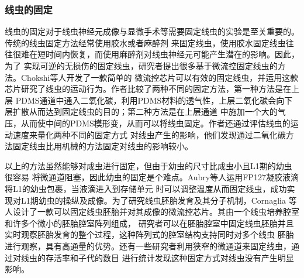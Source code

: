 \subsubsection{线虫的固定}
\label{sec:intro:analog}
	线虫的固定对于线虫神经元成像与显微手术\cite{Gokce2014A}等需要固定线虫的实验是至关重要的。传统的线虫固定方法经常使用胶水或者麻醉剂
	来固定线虫，使用胶水固定线虫往往很难在短时间内恢复，而使用麻醉剂对线虫神经元可能产生潜在的影响。因此，为了
	实现可逆的无损伤的固定线虫，研究者提出很多基于微流控固定线虫的方法。Chokshi等人\cite{Chokshi2009CO2}开发了一款简单的
	微流控芯片可以有效的固定线虫，并运用这款芯片研究了线虫的运动行为。作者比较了两种不同的固定方法，第一种方法是在上层
	PDMS通道中通入二氧化碳，利用PDMS材料的透气性，上层二氧化碳会向下层扩散从而达到固定线虫的目的；第二种方法是在上层通道
	中施加一个大的气压，从而使中间的PDMS模形变，从而可以将线虫固定。作者还通过评估线虫的运动速度来量化两种不同的固定方式
	对线虫产生的影响，他们发现通过二氧化碳方法固定线虫比用机械的方法固定对线虫的影响较小。
	
	以上的方法虽然能够对成虫进行固定，但由于幼虫的尺寸比成虫小且L1期的幼虫很容易
	将微通道阻塞，因此幼虫的固定是个难点。Aubry等人\cite{Aubry2015Hydrogel}运用FP127凝胶液滴将L1的幼虫包裹，当液滴进入到存储单元
	时可以调整温度从而固定线虫，成功实现对L1期幼虫的操纵及成像。为了研究线虫胚胎发育及其分子机制，Cornaglia
	等人\cite{Cornaglia2015An}设计了一款可以固定线虫胚胎并对其成像的微流控芯片。其由一个线虫培养腔室和许多个微小的胚胎腔室阵列组成，
	研究者可以在胚胎腔室中固定线虫胚胎并且实时观察胚胎发育的整个过程，这种阵列式的腔室结构支持同时对多个线虫
	胚胎进行观察，具有高通量的优势。还有一些研究者利用狭窄的微通道来固定线虫\cite{Lee2014A,Hulme2007A}，通过对线虫的存活率和子代的数目
	进行统计发现这种固定方式对线虫没有产生明显影响。
